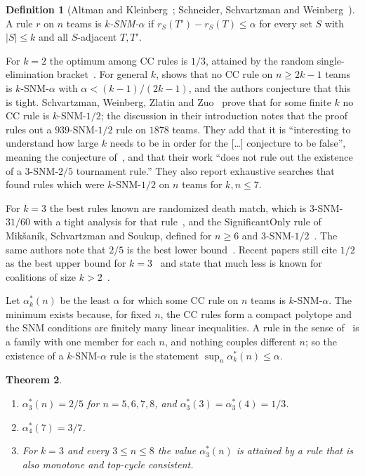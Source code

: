 \documentclass[11pt]{amsart}
\newtheorem{theorem}{Theorem}[section]
\theoremstyle{definition}
\newtheorem{definition}[theorem]{Definition}
\theoremstyle{remark}
\begin{document}
\begin{definition}[Altman and Kleinberg~\cite{AK10}; Schneider, Schvartzman and Weinberg~\cite{SSW17}]
A rule $r$ on $n$ teams is \emph{$k$-SNM-$\alpha$} if $r_S(T')-r_S(T)\le\alpha$ for every set $S$ with $|S|\le k$ and all $S$-adjacent $T,T'$.
\end{definition}

For $k=2$ the optimum among CC rules is $1/3$, attained by the random single-elimination bracket~\cite{SSW17}. For general $k$, \cite[Theorem~3.2]{SSW17} shows that no CC rule on $n\ge 2k-1$ teams is $k$-SNM-$\alpha$ with $\alpha<(k-1)/(2k-1)$, and the authors conjecture that this is tight. Schvartzman, Weinberg, Zlatin and Zuo~\cite{SWZZ20} prove that for some finite $k$ no CC rule is $k$-SNM-$1/2$; the discussion in their introduction notes that the proof rules out a $939$-SNM-$1/2$ rule on $1878$ teams. They add that it is ``interesting to understand how large $k$ needs to be in order for the [\dots] conjecture to be false'', meaning the conjecture of~\cite{SSW17}, and that their work ``does not rule out the existence of a $3$-SNM-$2/5$ tournament rule.'' They also report exhaustive searches that found rules which were $k$-SNM-$1/2$ on $n$ teams for $k,n\le 7$.

For $k=3$ the best rules known are randomized death match, which is $3$-SNM-$31/60$ with a tight analysis for that rule~\cite{DW22}, and the SignificantOnly rule of Mik\v{s}an\'ik, Schvartzman and Soukup, defined for $n\ge 6$ and $3$-SNM-$1/2$~\cite{MSS24}. The same authors note that $2/5$ is the best lower bound~\cite[footnotes~2 and~8]{MSS24}. Recent papers still cite $1/2$ as the best upper bound for $k=3$~\cite{PSW25} and state that much less is known for coalitions of size $k>2$~\cite{DLW26}.

Let $\alpha^*_k(n)$ be the least $\alpha$ for which some CC rule on $n$ teams is $k$-SNM-$\alpha$. The minimum exists because, for fixed $n$, the CC rules form a compact polytope and the SNM conditions are finitely many linear inequalities. A rule in the sense of~\cite{SWZZ20} is a family with one member for each $n$, and nothing couples different $n$; so the existence of a $k$-SNM-$\alpha$ rule is the statement $\sup_n\alpha^*_k(n)\le\alpha$.

\begin{theorem}\label{thm:main}
\begin{enumerate}
\item $\alpha^*_3(n)=2/5$ for $n=5,6,7,8$, and $\alpha^*_3(3)=\alpha^*_3(4)=1/3$.
\item $\alpha^*_4(7)=3/7$.
\item For $k=3$ and every $3\le n\le 8$ the value $\alpha^*_3(n)$ is attained by a rule that is also monotone and top-cycle consistent.
\end{enumerate}
\end{theorem}
\end{document}
